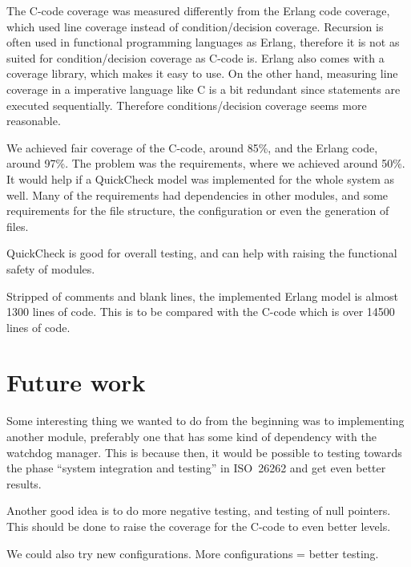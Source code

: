 The C-code coverage was measured differently from the Erlang code
coverage, which used line coverage instead of condition/decision
coverage. Recursion is often used in functional programming languages
as Erlang, therefore it is not as suited for condition/decision
coverage as C-code is. Erlang also comes with a coverage library,
which makes it easy to use. On the other hand, measuring line coverage
in a imperative language like C is a bit redundant since statements
are executed sequentially. Therefore conditions/decision coverage
seems more reasonable.

We achieved fair coverage of the C-code, around 85\%, and the Erlang
code, around 97\%. The problem was the requirements, where we achieved
around 50\%. It would help if a QuickCheck model was implemented for
the whole system as well. Many of the requirements had dependencies in
other modules, and some requirements for the file structure, the
configuration or even the generation of files.

QuickCheck is good for overall testing, and can help with raising the
functional safety of modules.


Stripped of comments and blank lines, the implemented Erlang model is
almost 1300 lines of code. This is to be compared with the C-code
which is over 14500 lines of code.


\section{Future work}
Some interesting thing we wanted to do from the beginning was to implementing
another module, preferably one that has some kind of dependency with the
watchdog manager. This is because then, it would be possible to testing towards
the phase ``system integration and testing'' in ISO~26262 and get even better
results.

Another good idea is to do more negative testing, and testing of null
pointers. This should be done to raise the coverage for the C-code to even
better levels.

We could also try new configurations. More configurations = better testing.